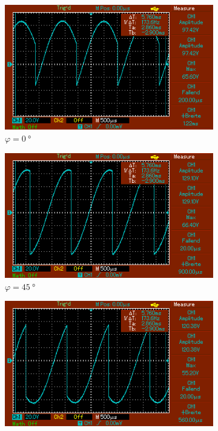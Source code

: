 \begin{figure}
    \centering
    \begin{subfigure}{0.3\textwidth}
        \centering
        \includegraphics[width=\textwidth]{images/2_0.png}
        \caption{$\varphi = \SI{0}{\degree}$}
        \label{fig:2_0}
    \end{subfigure}
    \begin{subfigure}{0.3\textwidth}
        \centering
        \includegraphics[width=\textwidth]{images/2_45.png}
        \caption{$\varphi = \SI{45}{\degree}$}
        \label{fig:2_45}
    \end{subfigure}
    \begin{subfigure}{0.3\textwidth}
        \centering
        \includegraphics[width=\textwidth]{images/2_90.png}

\end{subfigure}
\end{figure}
